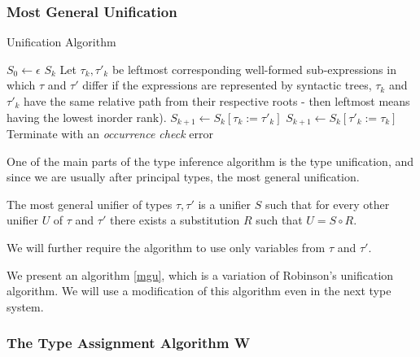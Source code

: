 \subsubsection{Most General Unification}

\begin{algorithm}[t]
\caption{Unification Algorithm \cite{robinson1965machine}}
\label{mgu}
\begin{algorithmic}[1]
    \State $S_0 \gets \epsilon$
        \Return $S_k$
    \EndIf
    \State Let $\tau_k, \tau'_k$ be leftmost corresponding well-formed sub-expressions in which $\tau$ and $\tau'$ differ \Comment if the expressions are represented by syntactic trees, $\tau_k$ and $\tau'_k$ have the same relative path from their respective roots - then leftmost means having the lowest inorder rank).
        \State $S_{k+1} \gets S_k [\tau_k := \tau'_k]$
        \State $S_{k+1} \gets S_k [\tau'_k := \tau_k]$
    \Else
        \State Terminate with an \textit{occurrence check} error
    \EndIf
    \EndFor
\EndFunction
\end{algorithmic}
\end{algorithm}

One of the main parts of the type inference algorithm is the type unification, and since we are usually after principal types, the most general unification.

\begin{defn}
    The most general unifier of types $\tau, \tau'$ is a unifier $S$ such that for every other unifier $U$ of $\tau$ and $\tau'$ there exists a substitution $R$ such that $U = S \circ R$. \cite{damas1982principal}
\end{defn}

We will further require the algorithm to use only variables from $\tau$ and $\tau'$.

We present an algorithm \ref{mgu}, which is a variation of Robinson's unification algorithm. We will use a modification of this algorithm even in the next type system.

\subsubsection{The Type Assignment Algorithm W}

